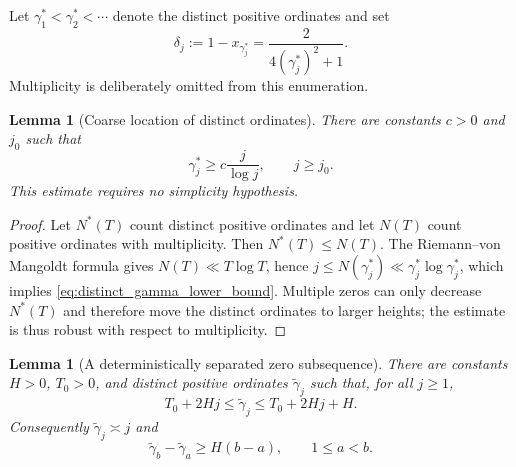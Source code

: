 \documentclass[11pt]{amsart}
\numberwithin{equation}{section}
\theoremstyle{plain}
\newtheorem{lemma}[theorem]{Lemma}
\theoremstyle{definition}
\theoremstyle{remark}
\begin{document}
Let $\gamma_1^*<\gamma_2^*<\cdots$ denote the distinct positive ordinates and set
\begin{equation}
\delta_j:=1-x_{\gamma_j^*}=\frac{2}{4(\gamma_j^*)^2+1}.
\label{eq:delta_distinct_nodes}
\end{equation}
Multiplicity is deliberately omitted from this enumeration.

\begin{lemma}[Coarse location of distinct ordinates]
\label{lem:distinct_ordinate_lower_bound}
There are constants $c>0$ and $j_0$ such that
\begin{equation}
\gamma_j^*\ge c\frac{j}{\log j},
\qquad j\ge j_0.
\label{eq:distinct_gamma_lower_bound}
\end{equation}
This estimate requires no simplicity hypothesis.
\end{lemma}

\begin{proof}
Let $N^*(T)$ count distinct positive ordinates and let $N(T)$ count positive ordinates with multiplicity. Then $N^*(T)\le N(T)$. The Riemann--von Mangoldt formula gives $N(T)\ll T\log T$, hence
$j\le N(\gamma_j^*)\ll \gamma_j^*\log\gamma_j^*$, which implies \eqref{eq:distinct_gamma_lower_bound}. Multiple zeros can only decrease $N^*(T)$ and therefore move the distinct ordinates to larger heights; the estimate is thus robust with respect to multiplicity.
\end{proof}

\begin{lemma}[A deterministically separated zero subsequence]
\label{lem:separated_zero_subsequence}
There are constants $H>0$, $T_0>0$, and distinct positive ordinates $\widetilde\gamma_j$ such that, for all $j\ge1$,
\begin{equation}
T_0+2Hj\le \widetilde\gamma_j\le T_0+2Hj+H.
\label{eq:separated_gamma_boxes}
\end{equation}
Consequently $\widetilde\gamma_j\asymp j$ and
\begin{equation}
\widetilde\gamma_b-\widetilde\gamma_a\ge H(b-a),
\qquad 1\le a<b.
\label{eq:separated_gamma_gap}
\end{equation}
\end{lemma}
\end{document}
